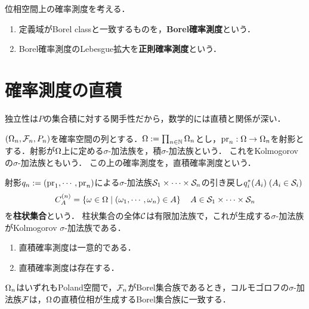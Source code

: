 \documentclass[uplatex,dvipdfmx]{jsreport}
\begin{document}
\begin{definition}\label{def-regular-measure}
    位相空間上の確率測度を考える．
    \begin{enumerate}
        \item 定義域がBorel classと一致するものを，\textbf{Borel確率測度}という．
        \item Borel確率測度のLebesgue拡大を\textbf{正則確率測度}という．
    \end{enumerate}
\end{definition}

\section{確率測度の直積}

\begin{tcolorbox}[colframe=ForestGreen, colback=ForestGreen!10!white,breakable,colbacktitle=ForestGreen!40!white,coltitle=black,fonttitle=\bfseries\sffamily,
title=]
    独立性は$P$の集合積に対する関手性だから，数学的には直積と関係が深い．
\end{tcolorbox}

\begin{definition}
    $(\Omega_n,\mathcal{F}_n,P_n)$を確率空間の列とする．$\Omega:=\prod_{n\in\mathbb{N}}\Omega_n$とし，$\mathrm{pr}_n:\Omega\to\Omega_n$を射影とする．射影が$\Omega$上に定める$\sigma$-加法族を，積$\sigma$-加法族という．
    これをKolmogorovの$\sigma$-加法族ともいう．
    この上の確率測度を，直積確率測度という．
\end{definition}
\begin{remark}\label{remark-cylinder-sets}
    射影$q_n:=(\mathrm{pr}_1,\cdots,\mathrm{pr}_n)$による$\sigma$-加法族$\mathcal{S}_1\times\cdots\times\mathcal{S}_n$の引き戻し$q_i^*(A_i)\;(A_i\in\mathcal{S}_i)$
    \[C_A^{(n)}=\left\{\omega\in\Omega\mid(\omega_1,\cdots,\omega_n)\in A\right\}\quad A\in\mathcal{S}_1\times\cdots\times\mathcal{S}_n\]
    を\textbf{柱状集合}という．
    柱状集合の全体$\mathcal{C}$は有限加法族で，これが生成する$\sigma$-加法族がKolmogorov $\sigma$-加法族である．
\end{remark}

\begin{lemma}\mbox{}
    \begin{enumerate}
        \item 直積確率測度は一意的である．
        \item 直積確率測度は存在する．
    \end{enumerate}
\end{lemma}

\begin{theorem}\label{thm-product-sigma-algebra}
    $\Omega_n$はいずれもPoland空間で，$\mathcal{F}_n$がBorel集合族であるとき，コルモゴロフの$\sigma$-加法族$\mathcal{F}$は，$\Omega$の直積位相が生成するBorel集合族に一致する．
\end{theorem}
\end{document}
